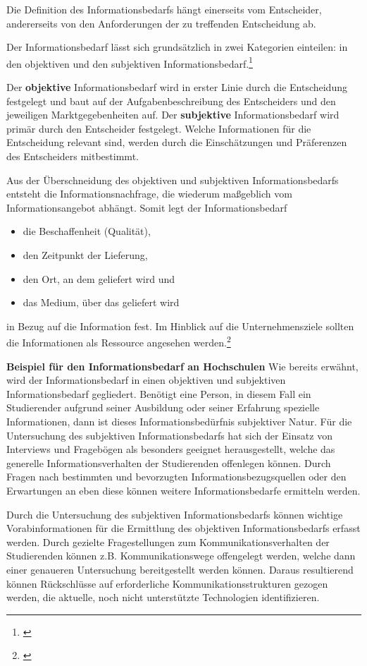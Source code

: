 Die Definition des Informationsbedarfs hängt einerseits vom Entscheider, andererseits von den Anforderungen der zu treffenden Entscheidung ab.

Der Informationsbedarf lässt sich grundsätzlich in zwei Kategorien einteilen: in den objektiven und den subjektiven Informationsbedarf.\footnote{\cite{picot_grenzenlos_2003}}

Der \textbf{objektive} Informationsbedarf wird in erster Linie durch die Entscheidung festgelegt und baut auf der Aufgabenbeschreibung des Entscheiders und den jeweiligen Marktgegebenheiten auf.
Der \textbf{subjektive} Informationsbedarf wird primär durch den Entscheider festgelegt. Welche Informationen für die Entscheidung relevant sind, werden durch die Einschätzungen und Präferenzen des Entscheiders mitbestimmt.

Aus der Überschneidung des objektiven und subjektiven Informationsbedarfs entsteht die Informationsnachfrage, die wiederum maßgeblich vom Informationsangebot abhängt. Somit legt der Informationsbedarf

\begin{itemize}
	\item die Beschaffenheit (Qualität),
	\item den Zeitpunkt der Lieferung,
	\item den Ort, an dem geliefert wird und
	\item das Medium, über das geliefert wird		 
\end{itemize}
in Bezug auf die Information fest. Im Hinblick auf die Unternehmensziele sollten die Informationen als Ressource angesehen werden.\footnote{\cite{bode_informationsbegriff_1997}} 

\textbf{Beispiel für den Informationsbedarf an Hochschulen}
Wie bereits erwähnt, wird der Informationsbedarf in einen objektiven und subjektiven Informationsbedarf gegliedert. Benötigt eine Person, in diesem Fall ein Studierender aufgrund seiner Ausbildung oder seiner Erfahrung spezielle Informationen, dann ist dieses Informationsbedürfnis subjektiver Natur. 
Für die Untersuchung des subjektiven Informationsbedarfs hat sich der Einsatz von Interviews und Fragebögen als besonders geeignet herausgestellt, welche das generelle Informationsverhalten der Studierenden offenlegen können. Durch Fragen nach bestimmten und bevorzugten Informationsbezugsquellen oder den Erwartungen an eben diese können weitere Informationsbedarfe ermitteln werden.

Durch die Untersuchung des subjektiven Informationsbedarfs können wichtige Vorabinformationen für die Ermittlung des objektiven Informationsbedarfs erfasst werden. Durch gezielte Fragestellungen zum Kommunikationsverhalten der Studierenden können z.B. Kommunikationswege offengelegt werden, welche dann einer genaueren Untersuchung bereitgestellt werden können. Daraus resultierend können Rückschlüsse auf erforderliche Kommunikationsstrukturen gezogen werden, die aktuelle, noch nicht unterstützte Technologien identifizieren. 

